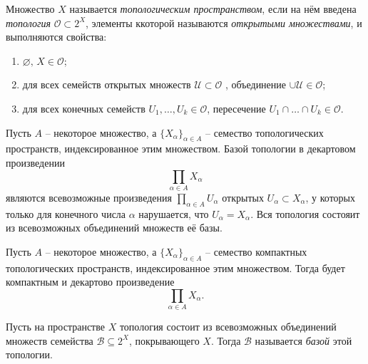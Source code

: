 

\begin{to_def}
    Множество $X$ называется \textit{топологическим пространством}, если на нём введена \textit{топология} $\mathcal O \subset 2^X$, элементы ккоторой называются \textit{открытыми множествами}, и выполняются свойства:
    \vspace{-3mm}
    \begin{enumerate}
        \item $\varnothing,\, X \in \mathcal O$;
        \item для всех семейств открытых множеств $\mathcal U \subset \mathcal O$ , объединение $\cup \mathcal U \in \mathcal O$;
        \item для всех конечных семейств $U_1, \ldots, U_k \in \mathcal O$, пересечение $U_1 \cap \ldots \cap U_k \in \mathcal O$. 
    \end{enumerate}
\end{to_def}


\begin{to_def}
    Пусть $A$ -- некоторое множество, а $\{X_\alpha\}_{\alpha \in A}$ -- семество топологических пространств, индексированное этим множеством. Базой топологии в декартовом произведении
    \begin{equation*}
        \prod_{\alpha \in A} X_\alpha
    \end{equation*}
    являются всевозможные произведения $\prod_{\alpha \in A} U_\alpha$ открытых $U_\alpha \subset X_\alpha$, у которых только для конечного числа $\alpha$ нарушается, что $U_\alpha = X_\alpha$. Вся топология состояит из всевозможных объединений множеств её базы. 
\end{to_def}



\begin{to_thr}
    Пусть $A$ -- некоторое множество, а $\{X_\alpha\}_{\alpha \in A}$ -- семество компактных топологических пространств, индексированное этим множеством. Тогда будет компактным и декартово произведение
    \begin{equation*}
        \prod_{\alpha \in A} X_\alpha.
    \end{equation*}
\end{to_thr}

\begin{to_def}
    Пусть на пространстве $X$ топология состоит из всевозможных объединений множеств семейства $\mathcal B \subseteq 2^X$, покрывающего $X$. Тогда $\mathcal B$ называется \textit{базой} этой топологии. 
\end{to_def}


